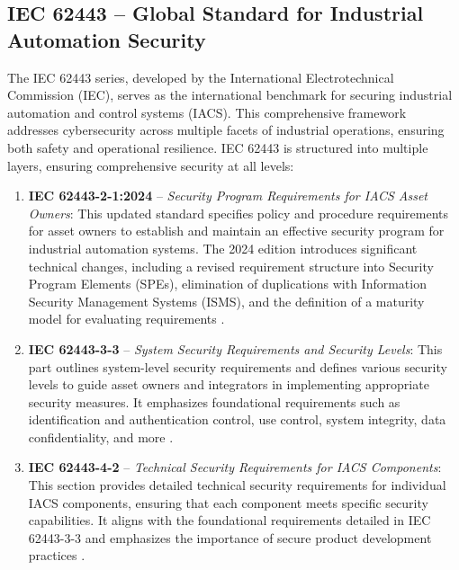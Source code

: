 \subsection{IEC 62443 – Global Standard for Industrial Automation Security} 
The IEC 62443 series, developed by the International Electrotechnical Commission (IEC), serves as the international benchmark for securing industrial automation and control systems (IACS). This comprehensive framework addresses cybersecurity across multiple facets of industrial operations, ensuring both safety and operational resilience. IEC 62443 is structured into multiple layers, ensuring comprehensive security at all levels:
    \begin{enumerate}
        \item \textbf{IEC 62443-2-1:2024} – \textit{Security Program Requirements for IACS Asset Owners}: This updated standard specifies policy and procedure requirements for asset owners to establish and maintain an effective security program for industrial automation systems. The 2024 edition introduces significant technical changes, including a revised requirement structure into Security Program Elements (SPEs), elimination of duplications with Information Security Management Systems (ISMS), and the definition of a maturity model for evaluating requirements \cite{iec1}.
        \item \textbf{IEC 62443-3-3} – \textit{System Security Requirements and Security Levels}: This part outlines system-level security requirements and defines various security levels to guide asset owners and integrators in implementing appropriate security measures. It emphasizes foundational requirements such as identification and authentication control, use control, system integrity, data confidentiality, and more \cite{ISA}.
        \item \textbf{IEC 62443-4-2} – \textit{Technical Security Requirements for IACS Components}: This section provides detailed technical security requirements for individual IACS components, ensuring that each component meets specific security capabilities. It aligns with the foundational requirements detailed in IEC 62443-3-3 and emphasizes the importance of secure product development practices \cite{ISA}.
    \end{enumerate}
    
